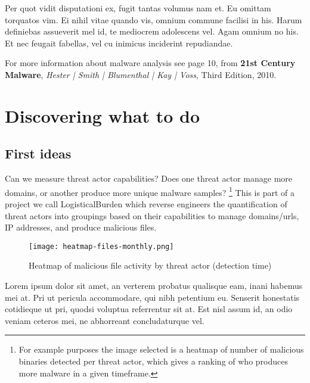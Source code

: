 \documentclass[11pt,fleqn]{book} %
\begin{document}
Per quot vidit disputationi ex, fugit tantas volumus nam et. Eu omittam torquatos vim. Ei nihil vitae quando vis, omnium commune facilisi in his. Harum definiebas assueverit mel id, te mediocrem adolescens vel. Agam omnium no his. Et nec feugait fabellas, vel cu inimicus inciderint repudiandae.

\begin{remark}
For more information about malware analysis see page 10, from \textbf{21st Century Malware}, \textit{Hester | Smith | Blumenthal | Kay | Voss}, Third Edition, 2010.
\end{remark}




\chapter{Discovering what to do}

\section{First ideas}
Can we measure threat actor capabilities? Does one threat actor manage more domains, or another produce more unique malware samples? \footnote{For example purposes the image selected is a heatmap of number of malicious binaries detected per threat actor, which gives a ranking of who produces more malware in a given timeframe. } This is part of a project we call LogisticalBurden which reverse engineers the quantification of threat actors into groupings based on their capabilities to manage domains/urls, IP addresses, and produce malicious files.

\begin{figure}[h]
    \centering
    \texttt{[image: heatmap-files-monthly.png]}
    \caption{Heatmap of malicious file activity by threat actor (detection time)}
    \label{fig:awesome_image}
\end{figure}

Lorem ipsum dolor sit amet, an verterem probatus qualisque eam, inani habemus mei at. Pri ut pericula accommodare, qui nibh petentium eu. Senserit honestatis cotidieque ut pri, quodsi voluptua referrentur sit at. Est nisl assum id, an odio veniam ceteros mei, ne abhorreant concludaturque vel.
\end{document}
